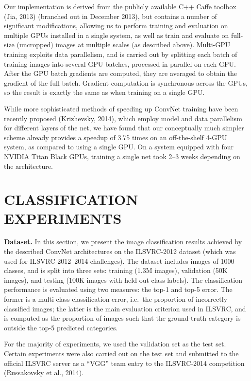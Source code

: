 \documentclass[12pt,a4paper,UTF8,twoside]{book}
\begin{document}
Our implementation is derived from the publicly available C++ Caffe toolbox (Jia, 2013) (branched out in December 2013), but contains a number of significant modifications, allowing us to perform training and evaluation on multiple GPUs installed in a single system, as well as train and evaluate on full-size (uncropped) images at multiple scales (as described above). Multi-GPU training exploits data parallelism, and is carried out by splitting each batch of training images into several GPU batches, processed in parallel on each GPU. After the GPU batch gradients are computed, they are averaged to obtain the gradient of the full batch. Gradient computation is synchronous across the GPUs, so the result is exactly the same as when training on a single GPU.

While more sophisticated methods of speeding up ConvNet training have been recently proposed (Krizhevsky, 2014), which employ model and data parallelism for different layers of the net, we have found that our conceptually much simpler scheme already provides a speedup of 3.75 times on an off-the-shelf 4-GPU system, as compared to using a single GPU. On a system equipped with four NVIDIA Titan Black GPUs, training a single net took 2--3 weeks depending on the architecture.

\hypertarget{classification-experiments}{%
\section{CLASSIFICATION EXPERIMENTS}\label{classification-experiments}}

\textbf{Dataset.} In this section, we present the image classification results achieved by the described ConvNet architectures on the ILSVRC-2012 dataset (which was used for ILSVRC 2012--2014 challenges). The dataset includes images of 1000 classes, and is split into three sets: training (1.3M images), validation (50K images), and testing (100K images with held-out class labels). The classification performance is evaluated using two measures: the top-1 and top-5 error. The former is a multi-class classification error, i.e.~the proportion of incorrectly classified images; the latter is the main evaluation criterion used in ILSVRC, and is computed as the proportion of images such that the ground-truth category is outside the top-5 predicted categories.

For the majority of experiments, we used the validation set as the test set. Certain experiments were also carried out on the test set and submitted to the official ILSVRC server as a ``VGG'' team entry to the ILSVRC-2014 competition (Russakovsky et al., 2014).
\end{document}
